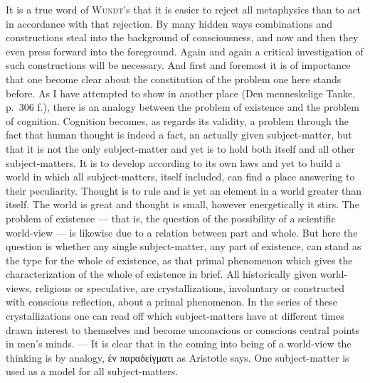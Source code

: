 \documentclass[12pt]{book}
\newcommand{\opage}[1]{\marginnote{\footnotesize\textit{[#1]}}}
\begin{document}
It is a true word of \textsc{Wundt}'s that it is easier to reject all metaphysics
than to act in accordance with that rejection. By many hidden ways combinations
and constructions steal into the background of consciousness, and now and then
they even press forward into the foreground. Again and again a critical
investigation of such constructions will be necessary. And first and foremost it
is of importance that one become clear about the constitution of the problem one
here stands before. As I have attempted to show in another place (Den
menneskelige Tanke, p.\ 306 f.), there is an analogy between the problem of
existence and the problem of cognition. Cognition becomes, as regards its
validity, \opage{125}a problem through the fact that human thought is indeed a fact, an
actually given subject-matter, but that it is not the only subject-matter and yet
is to hold both itself and all other subject-matters. It is to develop according
to its own laws and yet to build a world in which all subject-matters, itself
included, can find a place answering to their peculiarity. Thought is to rule and
is yet an element in a world greater than itself. The world is great and thought
is small, however energetically it stirs. The problem of existence --- that is,
the question of the possibility of a scientific world-view --- is likewise due to
a relation between part and whole. But here the question is whether any single
subject-matter, any part of existence, can stand as the type for the whole of
existence, as that primal phenomenon which gives the characterization of the whole
of existence in brief. All historically given world-views, religious or
speculative, are crystallizations, involuntary or constructed with conscious
reflection, about a primal phenomenon. In the series of these crystallizations one
can read off which subject-matters have at different times drawn interest to
themselves and become unconscious or conscious central points in men's minds. ---
It is clear that in the coming into being of a world-view the thinking is by
analogy, ἐν παραδείγματι as Aristotle says. One subject-matter is used as a model
for all subject-matters.
\end{document}
